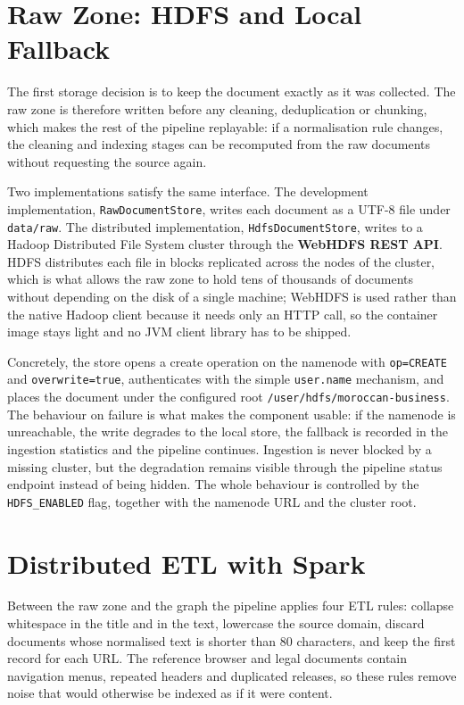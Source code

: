 \section{Raw Zone: HDFS and Local Fallback}
\label{sec:hdfs}
The first storage decision is to keep the document exactly as it was collected. The raw zone is therefore written before any cleaning, deduplication or chunking, which makes the rest of the pipeline replayable: if a normalisation rule changes, the cleaning and indexing stages can be recomputed from the raw documents without requesting the source again.

Two implementations satisfy the same interface. The development implementation, \texttt{RawDocumentStore}, writes each document as a UTF-8 file under \texttt{data/raw}. The distributed implementation, \texttt{HdfsDocumentStore}, writes to a Hadoop Distributed File System cluster through the \textbf{WebHDFS REST API}. HDFS distributes each file in blocks replicated across the nodes of the cluster, which is what allows the raw zone to hold tens of thousands of documents without depending on the disk of a single machine; WebHDFS is used rather than the native Hadoop client because it needs only an HTTP call, so the container image stays light and no JVM client library has to be shipped.

Concretely, the store opens a create operation on the namenode with \texttt{op=CREATE} and \texttt{overwrite=true}, authenticates with the simple \texttt{user.name} mechanism, and places the document under the configured root \texttt{/user/hdfs/moroccan-business}. The behaviour on failure is what makes the component usable: if the namenode is unreachable, the write degrades to the local store, the fallback is recorded in the ingestion statistics and the pipeline continues. Ingestion is never blocked by a missing cluster, but the degradation remains visible through the pipeline status endpoint instead of being hidden. The whole behaviour is controlled by the \texttt{HDFS\_ENABLED} flag, together with the namenode URL and the cluster root.

\section{Distributed ETL with Spark}
\label{sec:spark}
Between the raw zone and the graph the pipeline applies four ETL rules: collapse whitespace in the title and in the text, lowercase the source domain, discard documents whose normalised text is shorter than 80 characters, and keep the first record for each URL. The reference browser and legal documents contain navigation menus, repeated headers and duplicated releases, so these rules remove noise that would otherwise be indexed as if it were content.

